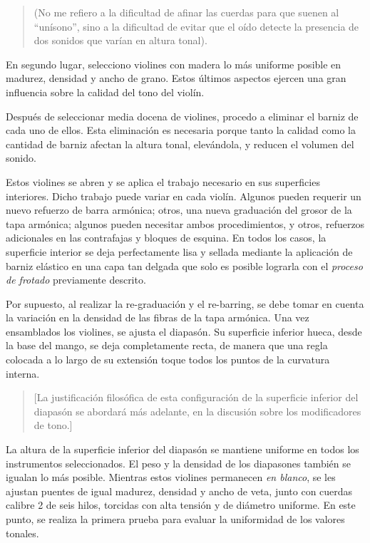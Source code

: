 \documentclass[12pt]{book}
\begin{document}
\begin{quote}
(No me refiero a la dificultad de afinar las cuerdas para que suenen al ``unísono'', sino a la dificultad de evitar que el oído detecte la presencia de dos sonidos que varían en altura tonal).
\end{quote}

En segundo lugar, selecciono violines con madera lo más uniforme posible en madurez, densidad y ancho de grano. Estos últimos aspectos ejercen una gran influencia sobre la calidad del tono del violín.

Después de seleccionar media docena de violines, procedo a eliminar el barniz de cada uno de ellos. Esta eliminación es necesaria porque tanto la calidad como la cantidad de barniz afectan la altura tonal, elevándola, y reducen el volumen del sonido.

Estos violines se abren y se aplica el trabajo necesario en sus superficies interiores. Dicho trabajo puede variar en cada violín. Algunos pueden requerir un nuevo refuerzo de barra armónica; otros, una nueva graduación del grosor de la tapa armónica; algunos pueden necesitar ambos procedimientos, y otros, refuerzos adicionales en las contrafajas y bloques de esquina. En todos los casos, la superficie interior se deja perfectamente lisa y sellada mediante la aplicación de barniz elástico en una capa tan delgada que solo es posible lograrla con el \textit{proceso de frotado} previamente descrito.

Por supuesto, al realizar la re-graduación y el re-barring, se debe tomar en cuenta la variación en la densidad de las fibras de la tapa armónica. Una vez ensamblados los violines, se ajusta el diapasón. Su superficie inferior hueca, desde la base del mango, se deja completamente recta, de manera que una regla colocada a lo largo de su extensión toque todos los puntos de la curvatura interna.

\begin{quote}
[La justificación filosófica de esta configuración de la superficie inferior del diapasón se abordará más adelante, en la discusión sobre los modificadores de tono.]
\end{quote}

La altura de la superficie inferior del diapasón se mantiene uniforme en todos los instrumentos seleccionados. El peso y la densidad de los diapasones también se igualan lo más posible. Mientras estos violines permanecen \textit{en blanco}, se les ajustan puentes de igual madurez, densidad y ancho de veta, junto con cuerdas calibre 2 de seis hilos, torcidas con alta tensión y de diámetro uniforme. En este punto, se realiza la primera prueba para evaluar la uniformidad de los valores tonales.
\end{document}
